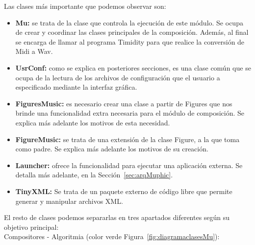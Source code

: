 Las clases más importante que podemos observar son:

\begin{itemize}

	\item \textbf{Mu:} se trata de la clase que controla la ejecución de este módulo. Se ocupa de crear y coordinar las clases principales de la composición. Además, al final se encarga de llamar al programa Timidity para que realice la conversión de Midi a Wav.
	
	\item \textbf{UsrConf:} como se explica en posteriores secciones, es una clase común que se ocupa de la lectura de los archivos de configuración que el usuario a especificado mediante la interfaz gráfica.
	
	\item \textbf{FiguresMusic:} es necesario crear una clase a partir de Figures que nos brinde una funcionalidad extra necesaria para el módulo de composición. Se explica más adelante los motivos de esta necesidad.
	
	\item \textbf{FigureMusic:} se trata de una extensión de la clase Figure, a la que toma como padre. Se explica más adelante los motivos de su creación.

	\item \textbf{Launcher:} ofrece la funcionalidad para ejecutar una aplicación externa. Se detalla más adelante, en la Sección~\ref{sec:arqMuphic}.

	\item \textbf{TinyXML:} Se trata de un paquete externo de código libre que permite generar y manipular archivos XML.

\end{itemize}

El resto de clases podemos separarlas en tres apartados diferentes según su objetivo principal:\\

Compositores - Algoritmia (color verde Figura~\ref{fig:diagramaclasesMu}):

